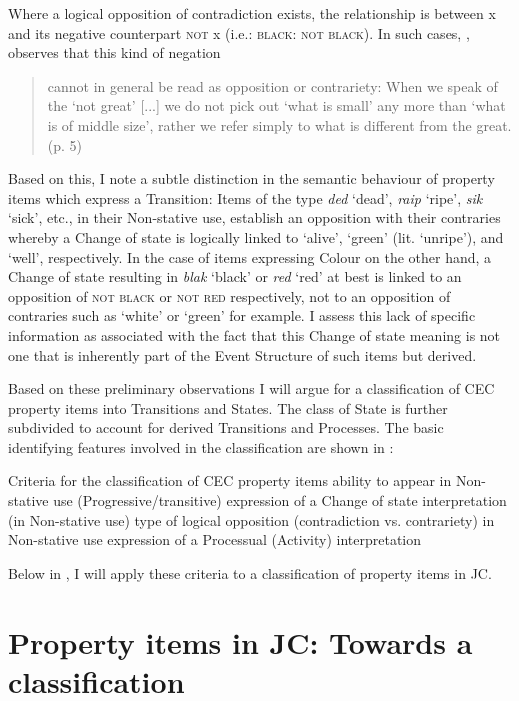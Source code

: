 Where a logical opposition of contradiction exists, the relationship is between x and its negative counterpart \textsc{not} x (i.e.: \textsc{black: not black}). In such cases, \citet{Horn1989}, observes that this kind of negation

\begin{quote}
cannot in general be read as opposition or contrariety: When we speak of the `not great' [...] we do not pick out `what is small' any more than `what is of middle size', rather we refer simply to what is different from the great. (p. 5)
\end{quote}

Based on this, I note a subtle distinction in the semantic behaviour of property items which express a Transition: Items of the type \textit{ded} `dead', \textit{raip} `ripe', \textit{sik} `sick', etc., in their Non-stative use, establish an opposition with their contraries whereby a Change of state is logically linked to `alive', `green' (lit. `unripe'), and `well', respectively. In the case of items expressing Colour on the other hand, a Change of state resulting in \textit{blak} `black' or \textit{red} `red' at best is linked to an opposition of \textsc{not black} or \textsc{not red} respectively, not to an opposition of contraries such as `white' or `green' for example. I assess this lack of specific information as associated with the fact that this Change of state meaning is not one that is inherently part of the Event Structure of such items but derived. 

Based on these preliminary observations I will argue for a classification of CEC property items into Transitions and States. The class of State is further subdivided to account for derived Transitions and Processes. The basic identifying features involved in the classification are shown in : 

\ea%
\label{ex:5:6}
Criteria for the classification of CEC property items
\ea ability to appear in Non-stative use (Progressive\slash transitive)
\ex expression of a Change of state interpretation (in Non-stative use)
\ex type of logical opposition (contradiction vs. contrariety) in Non-stative use
\ex expression of a Processual (Activity) interpretation
\z
\z 

Below in , I will apply these criteria to a classification of property items in JC.


\section{Property items in JC: Towards a classification}\label{sec:5.2}

